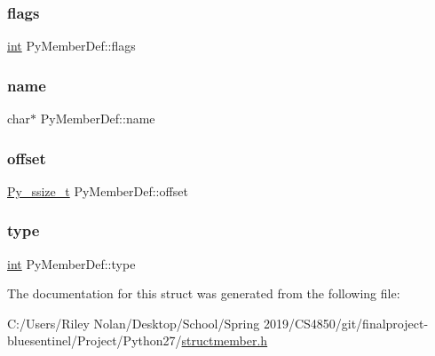 \subsubsection{\texorpdfstring{flags}{flags}}
{\footnotesize\ttfamily \mbox{\hyperlink{warnings_8h_a74f207b5aa4ba51c3a2ad59b219a423b}{int}} Py\+Member\+Def\+::flags}

\mbox{\label{struct_py_member_def_a20cf4c6ed77b26a0d87fc718a02aad35}} 
\subsubsection{\texorpdfstring{name}{name}}
{\footnotesize\ttfamily char$\ast$ Py\+Member\+Def\+::name}

\mbox{\label{struct_py_member_def_a78c440b432b027928ec9a7c88cff74d7}} 
\subsubsection{\texorpdfstring{offset}{offset}}
{\footnotesize\ttfamily \mbox{\hyperlink{pyport_8h_ac6411a3dfda9ac6feb9e8d859b1184bc}{Py\+\_\+ssize\+\_\+t}} Py\+Member\+Def\+::offset}

\mbox{\label{struct_py_member_def_ac76ca02c4307d56613dee98c198e569f}} 
\subsubsection{\texorpdfstring{type}{type}}
{\footnotesize\ttfamily \mbox{\hyperlink{warnings_8h_a74f207b5aa4ba51c3a2ad59b219a423b}{int}} Py\+Member\+Def\+::type}



The documentation for this struct was generated from the following file\+:\begin{DoxyCompactItemize}
\item 
C\+:/\+Users/\+Riley Nolan/\+Desktop/\+School/\+Spring 2019/\+C\+S4850/git/finalproject-\/bluesentinel/\+Project/\+Python27/\mbox{\hyperlink{structmember_8h}{structmember.\+h}}\end{DoxyCompactItemize}
